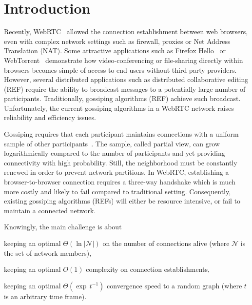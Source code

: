 
\section{Introduction}

Recently, WebRTC~\cite{webrtc} allowed the connection establishment between
web browsers, even with complex network settings such as firewall, proxies or
Net Address Translation (NAT).  Some attractive applications such as Firefox
Hello~\cite{firefoxhello} or WebTorrent~\cite{webtorrent} demonstrate how
video-conferencing or file-sharing directly within browsers becomes simple of
access to end-users without third-party providers. However, several distributed
applications such as distributed collaborative editing (REF) require the
ability to broadcast messages to a potentially large number of
participants. Traditionally, gossiping algorithms (REF) achieve such
broadcast. Unfortunately, the current gossiping algorithms in a WebRTC network
raises reliability and efficiency issues.

Gossiping requires that each participant maintains connections with a uniform
sample of other participants~\cite{jelasity2004peer}. The sample, called
partial view, can grow logarithmically compared to the number of participants
and yet providing connectivity with high probability. Still, the neighborhood
must be constantly renewed in order to prevent network partitions. In WebRTC,
establishing a browser-to-browser connection requires a three-way handshake
which is much more costly and likely to fail compared to traditional
setting. Consequently, existing gossiping algorithms (REFs) will either be
resource intensive, or fail to maintain a connected network.

Knowingly, the main challenge is about
\begin{inparaenum}[(i)]
\item keeping an optimal $\Theta(\ln |\mathcal{N}|)$ on the number of
    connections alive\cite{erdos1959random} (where $\mathcal{N}$ is the set of network members),
\item keeping an optimal $O(1)$ complexity on connection establishments,
\item keeping an optimal $\Theta(\exp \, t^{-1})$ convergence speed to a random
  graph (where $t$ is an arbitrary time frame).
\end{inparaenum}

